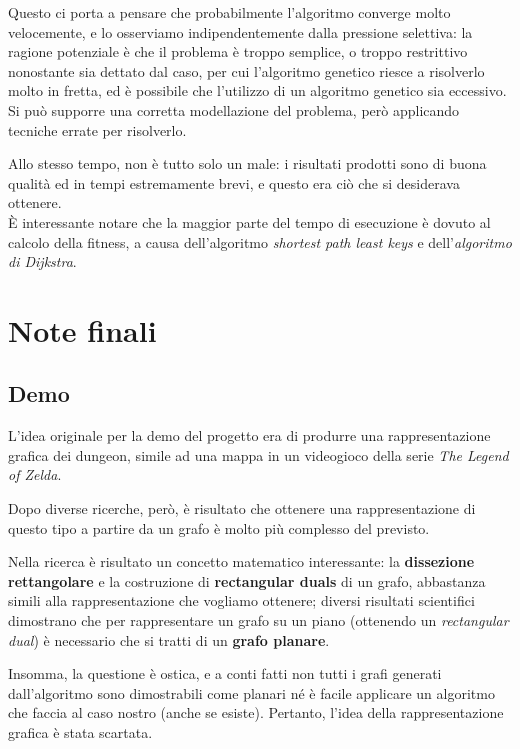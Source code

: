 \documentclass[12pt,titlepage]{article}
\begin{document}
\noindent Questo ci porta a pensare che probabilmente l'algoritmo converge molto velocemente, e lo osserviamo indipendentemente dalla pressione selettiva: la ragione potenziale è che il problema è troppo semplice, o troppo restrittivo nonostante sia dettato dal caso, per cui l'algoritmo genetico riesce a risolverlo molto in fretta, ed è possibile che l'utilizzo di un algoritmo genetico sia eccessivo. Si può supporre una corretta modellazione del problema, però applicando tecniche errate per risolverlo.

Allo stesso tempo, non è tutto solo un male: i risultati prodotti sono di buona qualità ed in tempi estremamente brevi, e questo era ciò che si desiderava ottenere.\\

\noindent È interessante notare che la maggior parte del tempo di esecuzione è dovuto al calcolo della fitness, a causa dell'algoritmo \textit{shortest path least keys} e dell'\textit{algoritmo di Dijkstra}.

\section{Note finali}

\subsection {Demo}

L'idea originale per la demo del progetto era di produrre una rappresentazione grafica dei dungeon, simile ad una mappa in un videogioco della serie \textit{The Legend of Zelda}.

Dopo diverse ricerche, però, è risultato che ottenere una rappresentazione di questo tipo a partire da un grafo è molto più complesso del previsto.

Nella ricerca è risultato un concetto matematico interessante: la \textbf{dissezione rettangolare} e la costruzione di \textbf{rectangular duals} di un grafo, abbastanza simili alla rappresentazione che vogliamo ottenere; diversi risultati scientifici dimostrano che per rappresentare un grafo su un piano (ottenendo un \textit{rectangular dual}) è necessario che si tratti di un \textbf{grafo planare}.

Insomma, la questione è ostica, e a conti fatti non tutti i grafi generati dall'algoritmo sono dimostrabili come planari né è facile applicare un algoritmo che faccia al caso nostro (anche se esiste\cite{bhasker}). Pertanto, l'idea della rappresentazione grafica è stata scartata.\\
\end{document}
